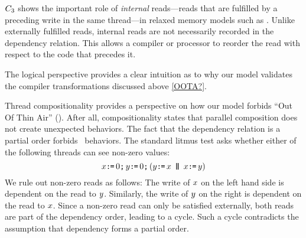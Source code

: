 $C_3$ shows the important role of \emph{internal} reads---reads that are
fulfilled by a preceding write in the same thread---in relaxed memory models
such as \armeight.  
Unlike externally fulfilled reads, %
internal reads are not necessarily recorded in the dependency relation.
This allows a compiler or processor to reorder the read with
respect to the code that precedes it.

The logical perspective provides a clear intuition as to why our model validates
the compiler transformations discussed above \eqref{OOTA?}.


Thread compositionality provides a perspective on how our model forbids ``Out
Of Thin Air'' (\oota).  After all, compositionality states that parallel
composition does not create  unexpected behaviors.  The fact that the
dependency relation is a partial order forbids \oota\ behaviors.  The
standard \oota{} litmus test asks whether either of the following threads can
see non-zero values:
\begin{displaymath}
  x\GETS0\SEMI y\GETS0\SEMI
  (\bLoc \GETS \aLoc \PAR \aLoc \GETS \bLoc)
\end{displaymath}
We rule out non-zero reads as follows: The write of $x$ on the left hand
side is dependent on the read to $y$.  Similarly, the write of $y$ on
the right is dependent on the read to $x$.  Since a non-zero read can
only be satisfied externally, both reads are part of the dependency order,
leading to a cycle.  Such a cycle contradicts the assumption that dependency
forms a partial order.







